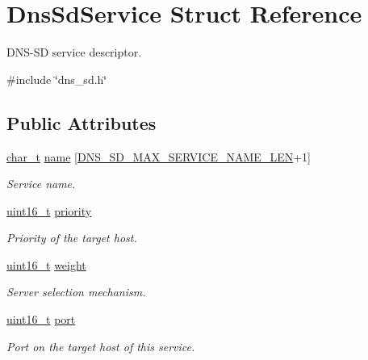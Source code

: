 \hypertarget{structDnsSdService}{}\section{Dns\+Sd\+Service Struct Reference}
\label{structDnsSdService}


D\+N\+S-\/\+SD service descriptor.  




{\ttfamily \#include \char`\"{}dns\+\_\+sd.\+h\char`\"{}}

\subsection*{Public Attributes}
\begin{DoxyCompactItemize}
\item 
\hyperlink{compiler__port_8h_a40bb5262bf908c328fbcfbe5d29d0201}{char\+\_\+t} \hyperlink{structDnsSdService_abc60a53b69dd0843ceefa6e7a7b0443c}{name} \mbox{[}\hyperlink{dns__sd_8h_a3338b6aea1abcee2bd66fa62c1f1bbdf}{D\+N\+S\+\_\+\+S\+D\+\_\+\+M\+A\+X\+\_\+\+S\+E\+R\+V\+I\+C\+E\+\_\+\+N\+A\+M\+E\+\_\+\+L\+EN}+1\mbox{]}
\begin{DoxyCompactList}\small\item\em Service name. \end{DoxyCompactList}\item 
\hyperlink{stdint_8h_a273cf69d639a59973b6019625df33e30}{uint16\+\_\+t} \hyperlink{structDnsSdService_afe6d19247c710cfd1eaa9f427488e498}{priority}
\begin{DoxyCompactList}\small\item\em Priority of the target host. \end{DoxyCompactList}\item 
\hyperlink{stdint_8h_a273cf69d639a59973b6019625df33e30}{uint16\+\_\+t} \hyperlink{structDnsSdService_a5a9548cecc8e63b7029f48fe83059234}{weight}
\begin{DoxyCompactList}\small\item\em Server selection mechanism. \end{DoxyCompactList}\item 
\hyperlink{stdint_8h_a273cf69d639a59973b6019625df33e30}{uint16\+\_\+t} \hyperlink{structDnsSdService_abf6fd1a073f7294ec927abb9b676c86a}{port}
\begin{DoxyCompactList}\small\item\em Port on the target host of this service. \end{DoxyCompactList}\item 

\end{DoxyCompactItemize}
